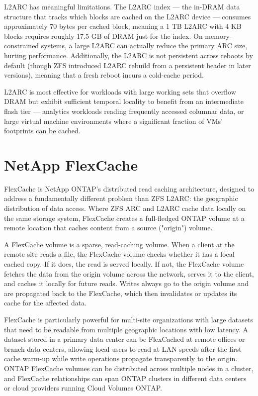 L2ARC has meaningful limitations. The L2ARC index --- the in-DRAM data structure that tracks which blocks are cached on the L2ARC device --- consumes approximately 70 bytes per cached block, meaning a 1 TB L2ARC with 4 KB blocks requires roughly 17.5 GB of DRAM just for the index. On memory-constrained systems, a large L2ARC can actually reduce the primary ARC size, hurting performance. Additionally, the L2ARC is not persistent across reboots by default (though ZFS introduced L2ARC rebuild from a persistent header in later versions), meaning that a fresh reboot incurs a cold-cache period.

L2ARC is most effective for workloads with large working sets that overflow DRAM but exhibit sufficient temporal locality to benefit from an intermediate flash tier --- analytics workloads reading frequently accessed columnar data, or large virtual machine environments where a significant fraction of VMs'{} footprints can be cached.

\section{NetApp FlexCache}
FlexCache is NetApp ONTAP's distributed read caching architecture, designed to address a fundamentally different problem than ZFS L2ARC: the geographic distribution of data access. Where ZFS ARC and L2ARC cache data locally on the same storage system, FlexCache creates a full-fledged ONTAP volume at a remote location that caches content from a source ("origin") volume.

A FlexCache volume is a sparse, read-caching volume. When a client at the remote site reads a file, the FlexCache volume checks whether it has a local cached copy. If it does, the read is served locally. If not, the FlexCache volume fetches the data from the origin volume across the network, serves it to the client, and caches it locally for future reads. Writes always go to the origin volume and are propagated back to the FlexCache, which then invalidates or updates its cache for the affected data.

FlexCache is particularly powerful for multi-site organizations with large datasets that need to be readable from multiple geographic locations with low latency. A dataset stored in a primary data center can be FlexCached at remote offices or branch data centers, allowing local users to read at LAN speeds after the first cache warm-up while write operations propagate transparently to the origin. ONTAP FlexCache volumes can be distributed across multiple nodes in a cluster, and FlexCache relationships can span ONTAP clusters in different data centers or cloud providers running Cloud Volumes ONTAP.

